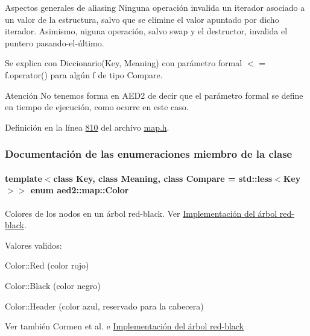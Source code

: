 \begin{DoxyParagraph}{\-Aspectos generales de aliasing}
\-Ninguna operación invalida un iterador asociado a un valor de la estructura, salvo que se elimine el valor apuntado por dicho iterador. \-Asimismo, niguna operación, salvo swap y el destructor, invalida el puntero pasando-\/el-\/último.
\end{DoxyParagraph}
\begin{DoxyParagraph}{\-Se explica con}
\-Diccionario(\-Key, \-Meaning) con parámetro formal $<$ = f.\-operator() para algún f de tipo \-Compare.
\end{DoxyParagraph}
\begin{DoxyAttention}{\-Atención}
\-No tenemos forma en \-A\-E\-D2 de decir que el parámetro formal se define en tiempo de ejecución, como ocurre en este caso. 
\end{DoxyAttention}


\-Definición en la línea \hyperlink{map_8h_source_l00810}{810} del archivo \hyperlink{map_8h_source}{map.\-h}.



\subsubsection{\-Documentación de las enumeraciones miembro de la clase}
\hypertarget{classaed2_1_1map_a6d62a415a4b9d320b30cada4ebcf9f5b_a6d62a415a4b9d320b30cada4ebcf9f5b}{
\paragraph[{\-Color}]{\setlength{\rightskip}{0pt plus 5cm}template$<$class \-Key, class \-Meaning, class \-Compare = std\-::less$<$\-Key$>$$>$ enum {\bf aed2\-::map\-::\-Color}}}\label{classaed2_1_1map_a6d62a415a4b9d320b30cada4ebcf9f5b_a6d62a415a4b9d320b30cada4ebcf9f5b}


\-Colores de los nodos en un árbol red-\/black. \-Ver \hyperlink{Implementacion}{\-Implementación del árbol red-\/black}. 

\-Valores validos\-: \begin{DoxyItemize}
\item \-Color\-::\-Red (color rojo) \item \-Color\-::\-Black (color negro) \item \-Color\-::\-Header (color azul, reservado para la cabecera)\end{DoxyItemize}
\begin{DoxySeeAlso}{\-Ver también}
\-Cormen et al. \cite{CormenLeisersonRivestStein2009} e \hyperlink{Implementacion}{\-Implementación del árbol red-\/black} 
\end{DoxySeeAlso}


